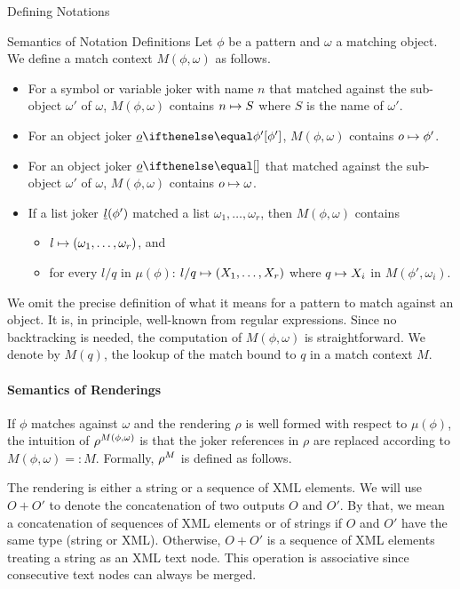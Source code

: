 \begin{omgroup}[creators=miko,short={Notation and Presentation},id=pres]
\begin{omgroup}[creators={miko,frabe},id=sec:ntn-definition]{Defining Notations}
\begin{omgroup}[id=sec:nd:semantics]{Semantics of Notation Definitions}
Let $\phi$ be a pattern and $\omega$ a matching {\openmath} object. We define a match context $M(\phi,\omega)$ as follows.
\begin{itemize}
	\item For a symbol or variable joker with name $n$ that matched against the sub-object $\omega'$ of $\omega$, $M(\phi,\omega)$ contains $n\mapsto S$ where $S$ is the name of $\omega'$.
	\item For an object joker $\JObj[\phi']{o}$, $M(\phi,\omega)$ contains $o\mapsto \phi'$.
	\item For an object joker $\JObj{o}$ that matched against the sub-object $\omega'$ of $\omega$, $M(\phi,\omega)$ contains $o\mapsto \omega$.
	\item If a list joker $\underline{l}(\phi')$ matched a list $\omega_1,\ldots,\omega_r$, then $M(\phi,\omega)$ contains 
    \begin{itemize}
     	\item $l\mapsto (\omega_1,\ldots,\omega_r)$, and
	    \item for every $l/q$ in $\mu(\phi)$: $l/q\mapsto (X_1,\ldots,X_r)$ where $q\mapsto X_i$ in $M(\phi',\omega_i)$.
    \end{itemize}
\end{itemize}
We omit the precise definition of what it means for a pattern to match against an object. It is, in principle, well-known from regular expressions. Since no backtracking is needed, the computation of $M(\phi,\omega)$ is straightforward. We denote by $M(q)$, the lookup of the match bound to $q$ in a match context $M$.

\paragraph{Semantics of Renderings}
If $\phi$ matches against $\omega$ and the rendering $\rho$ is well formed with respect to $\mu(\phi)$, the intuition of ${\rho}^{M(\phi,\omega)}$ is that the joker references in $\rho$ are replaced according to $M(\phi,\omega)=:M$. Formally, ${\rho}^{M}$ is defined as follows.

The rendering is either a string or a sequence of XML elements. We will use $O + O'$ to denote the concatenation of two outputs $O$ and $O'$. By that, we mean a concatenation of sequences of XML elements or of strings if $O$ and $O'$ have the same type (string or XML). Otherwise, $O+O'$ is a sequence of XML elements treating a string as an XML text node. This operation is associative since consecutive text nodes can always be merged.


\end{omgroup}
\end{omgroup}
\end{omgroup}
